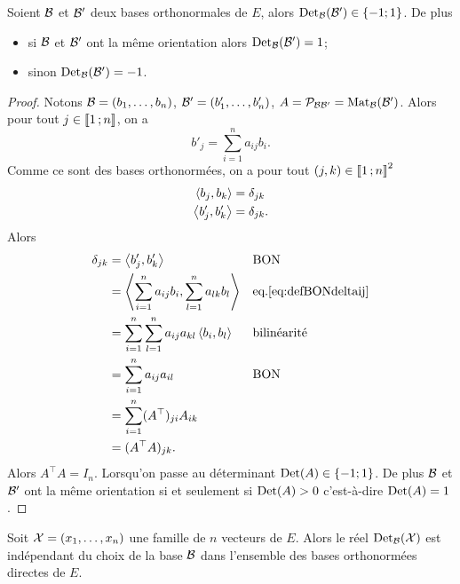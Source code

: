     \begin{lemme}
      Soient \(\mathcal{B}\) et \(\mathcal{B}'\) deux bases orthonormales de \(E\), alors \(\operatorname{Det}_{\mathcal{B}}(\mathcal{B}') \in \{-1; 1\}\). De plus
      \begin{itemize}
        \item si \(\mathcal{B}\) et \(\mathcal{B}'\) ont la même orientation alors \(\operatorname{Det}_{\mathcal{B}}(\mathcal{B}')=1\);
        \item sinon \(\operatorname{Det}_{\mathcal{B}}(\mathcal{B}')=-1\).
      \end{itemize}
    \end{lemme}
    \begin{proof}
      Notons \(\mathcal{B}=(b_1, \ldots, b_n)\), \(\mathcal{B}'=(b'_1, \ldots, b'_n)\), \(A=\mathcal{P}_{\mathcal{B} \mathcal{B}'}=\mathrm{Mat}_{\mathcal{B}}(\mathcal{B}')\). Alors pour tout \(j \in \mathopen{\llbracket}1\mathclose{}\mathpunct{};n\mathclose{\rrbracket}\), on a
      \begin{equation}
        b'_j = \sum_{i=1}^na_{ij}b_i.
      \end{equation}
      Comme ce sont des bases orthonormées, on a pour tout \((j,k) \in \mathopen{\llbracket}1\mathclose{}\mathpunct{};n\mathclose{\rrbracket}^2\)
      \begin{align}
        \left\langle{b_j},{b_k}\right\rangle &= \delta_{jk} \\
        \left\langle{b'_j},{b'_k}\right\rangle &= \delta_{jk} \label{eq:defBONdeltaij}.
      \end{align}
      Alors
      \begin{align}
        \delta_{jk} &= \left\langle{b'_j},{b'_k}\right\rangle && \text{BON}\\
                    &=\left\langle{\sum_{i=1}^na_{ij}b_i},{\sum_{l=1}^na_{lk}b_l}\right\rangle && \text{eq.} \eqref{eq:defBONdeltaij}\\
                    &=\sum_{i=1}^n\sum_{l=1}^n a_{ij}a_{kl} \left\langle{b_i},{b_l}\right\rangle && \text{bilinéarité}\\
                    &=\sum_{i=1}^na_{ij}a_{il} && \text{BON}\\
                    &=\sum_{i=1}^n (A^\top)_{ji}A_{ik} \\
                    &=(A^\top A)_{jk}.
      \end{align}
      Alors \(A^\top A=I_n\). Lorsqu'on passe au déterminant \(\operatorname{Det}(A) \in \{-1; 1\}\). De plus \(\mathcal{B}\) et \(\mathcal{B}'\) ont la même orientation si et seulement si \(\operatorname{Det}(A)>0\) c'est-à-dire \(\operatorname{Det}(A)=1\).
    \end{proof}
    \begin{lemme}
      Soit \(\mathcal{X}=(x_1, \ldots, x_n)\) une famille de \(n\) vecteurs de \(E\). Alors le réel \(\operatorname{Det}_{\mathcal{B}}(\mathcal{X})\) est indépendant du choix de la base \(\mathcal{B}\) dans l'ensemble des bases orthonormées directes de \(E\).
    \end{lemme}
